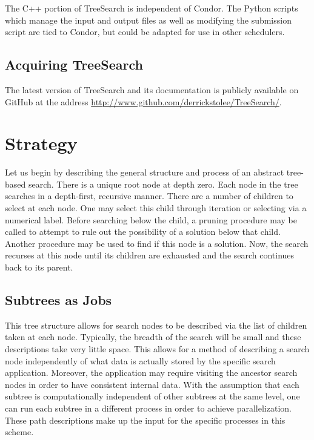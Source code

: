 \documentclass[11pt]{article}
\def\TreeSearch{{TreeSearch}}
\begin{document}
The C++ portion of {\TreeSearch} 
	is independent of Condor.
The Python scripts which manage the input and output files
	as well as modifying the submission script are
	tied to Condor, but 
	could be adapted for use in other schedulers.


\subsection{Acquiring \TreeSearch}

The latest version of {\TreeSearch} and its documentation
	is publicly available on GitHub \cite{github} at the address
	\href{http://www.github.com/derrickstolee/TreeSearch/}{http://www.github.com/derrickstolee/TreeSearch/}.


\section{Strategy}
\label{sec:Strategy}

Let us begin by describing the general structure and process of an abstract
	tree-based search.
There is a unique root node at depth zero.
Each node in the tree searches in a depth-first, recursive manner.
There are a number of children to select at each node.
One may select this child through iteration or selecting via a numerical label.
Before searching below the child, a pruning procedure may be called to attempt to 
	rule out the possibility of a solution below that child.
Another procedure may be used to find if this node is a solution.
Now, the search recurses at this node until its children are exhausted 
	and the search continues back to its parent.

\subsection{Subtrees as Jobs}

This tree structure allows for search nodes to be described via the 
	list of children taken at each node.
Typically, the breadth of the search will be small and these descriptions take very little space.
This allows for a method of describing a search node independently of 
	what data is actually stored by the specific search application.
Moreover, the application may require visiting the ancestor search nodes in order
	to have consistent internal data.
With the assumption that each subtree is computationally independent of other subtrees at the same level,
	one can run each subtree in a different process in order to achieve parallelization.
These path descriptions make up the input for the specific processes in this scheme.
\end{document}
